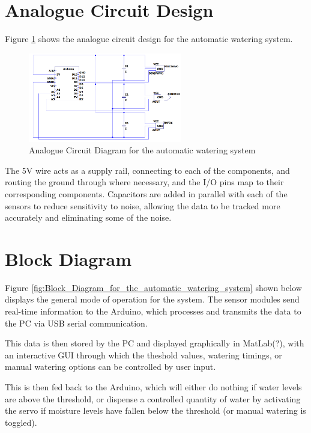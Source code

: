 \documentclass[a4paper,11pt]{article}
\begin{document}
\section{Analogue Circuit Design}
\label{sec:Analogue_Circuit_Design}

Figure \ref{fig:Analogue_Circuit_Diagram_for_the_automatic_watering_system}
shows the analogue circuit design for the automatic watering system.

\begin{figure}[H]
    \centering
    \includegraphics[width=0.6\textwidth]{Analogue Circuit Diagram.png}
    \caption{Analogue Circuit Diagram for the automatic watering system}
    \label{fig:Analogue_Circuit_Diagram_for_the_automatic_watering_system}
\end{figure}

The 5V wire acts as a supply rail, connecting to each of the components,
and routing the ground through where necessary, and 
the I/O pins map to their corresponding components.
Capacitors are added in parallel with each of the sensors
to reduce sensitivity to noise, allowing the data to be tracked
more accurately and eliminating some of the noise.

\section{Block Diagram}
\label{sec:Block_Diagram}

Figure \ref{fig:Block_Diagram_for_the_automatic_watering_system}
shown below displays the general mode of operation for the system.
The sensor modules send real-time information to the Arduino,
which processes and transmits the data to the PC via USB serial communication.

This data is then stored by the PC and displayed graphically in MatLab(?), 
with an interactive GUI through which the 
theshold values, watering timings, or manual watering options
can be controlled by user input.

This is then fed back to the Arduino, 
which will either do nothing if water levels are above the threshold,
or dispense a controlled quantity of water by activating the servo
if moisture levels have fallen below the threshold
(or manual watering is toggled).
\end{document}

